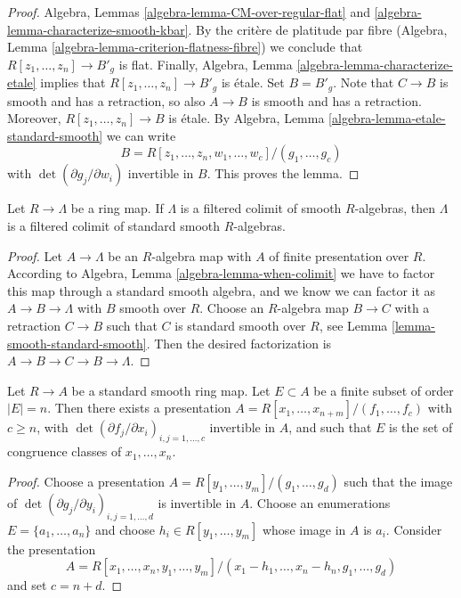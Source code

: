 \begin{proof}
Algebra, Lemmas \ref{algebra-lemma-CM-over-regular-flat} and
\ref{algebra-lemma-characterize-smooth-kbar}. By the crit\`ere
de platitude par fibre
(Algebra, Lemma \ref{algebra-lemma-criterion-flatness-fibre})
we conclude that $R[z_1, \ldots, z_n] \to B'_g$ is flat.
Finally, Algebra, Lemma \ref{algebra-lemma-characterize-etale}
implies that $R[z_1, \ldots, z_n] \to B'_g$ is \'etale.
Set $B = B'_g$. Note that $C \to B$ is smooth and has a retraction,
so also $A \to B$ is smooth and has a retraction.
Moreover, $R[z_1, \ldots, z_n] \to B$ is \'etale.
By Algebra, Lemma \ref{algebra-lemma-etale-standard-smooth}
we can write
$$
B = R[z_1, \ldots, z_n, w_1, \ldots, w_c]/(g_1, \ldots, g_c)
$$
with $\det(\partial g_j/\partial w_i)$ invertible in $B$.
This proves the lemma.
\end{proof}

\begin{lemma}
\label{lemma-colimit-standard-smooth}
Let $R \to \Lambda$ be a ring map. If $\Lambda$ is a filtered colimit of
smooth $R$-algebras, then $\Lambda$ is a filtered colimit of standard
smooth $R$-algebras.
\end{lemma}

\begin{proof}
Let $A \to \Lambda$ be an $R$-algebra map with $A$
of finite presentation over $R$. According to
Algebra, Lemma \ref{algebra-lemma-when-colimit}
we have to factor this map through a standard smooth algebra, and
we know we can factor it as $A \to B \to \Lambda$ with $B$ smooth
over $R$. Choose an $R$-algebra map $B \to C$ with a retraction
$C \to B$ such that $C$ is standard smooth over $R$, see
Lemma \ref{lemma-smooth-standard-smooth}.
Then the desired factorization is $A \to B \to C \to B \to \Lambda$.
\end{proof}

\begin{lemma}
\label{lemma-standard-smooth-include-generators}
Let $R \to A$ be a standard smooth ring map.
Let $E \subset A$ be a finite subset of order $|E| = n$.
Then there exists a presentation
$A = R[x_1, \ldots, x_{n + m}]/(f_1, \ldots, f_c)$ with $c \geq n$,
with $\det(\partial f_j/\partial x_i)_{i, j = 1, \ldots, c}$
invertible in $A$, and such that $E$ is the set of congruence classes of
$x_1, \ldots, x_n$.
\end{lemma}

\begin{proof}
Choose a presentation $A = R[y_1, \ldots, y_m]/(g_1, \ldots, g_d)$
such that the image of
$\det(\partial g_j/\partial y_i)_{i, j = 1, \ldots, d}$
is invertible in $A$. Choose an enumerations $E = \{a_1, \ldots, a_n\}$
and choose $h_i \in R[y_1, \ldots, y_m]$ whose image in $A$ is $a_i$.
Consider the presentation
$$
A = R[x_1, \ldots, x_n, y_1, \ldots, y_m]/
(x_1 - h_1, \ldots, x_n - h_n, g_1, \ldots, g_d)
$$
and set $c = n + d$.
\end{proof}


